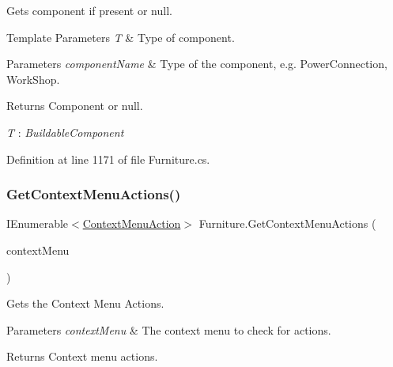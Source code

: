 Gets component if present or null. 


\begin{DoxyTemplParams}{Template Parameters}
{\em T} & Type of component.\\
\hline
\end{DoxyTemplParams}

\begin{DoxyParams}{Parameters}
{\em component\+Name} & Type of the component, e.\+g. Power\+Connection, Work\+Shop.\\
\hline
\end{DoxyParams}
\begin{DoxyReturn}{Returns}
Component or null.
\end{DoxyReturn}
\begin{Desc}
\item[Type Constraints]\begin{description}
\item[{\em T} : {\em Buildable\+Component}]\end{description}
\end{Desc}


Definition at line 1171 of file Furniture.\+cs.

\mbox{\label{class_furniture_ac89ee5662bc36695cc7d5b8eaa246f43}} 
\subsubsection{\texorpdfstring{Get\+Context\+Menu\+Actions()}{GetContextMenuActions()}}
{\footnotesize\ttfamily I\+Enumerable$<$\hyperlink{class_context_menu_action}{Context\+Menu\+Action}$>$ Furniture.\+Get\+Context\+Menu\+Actions (\begin{DoxyParamCaption}\item[{\hyperlink{class_context_menu}{Context\+Menu}}]{context\+Menu }\end{DoxyParamCaption})}



Gets the Context Menu Actions. 


\begin{DoxyParams}{Parameters}
{\em context\+Menu} & The context menu to check for actions.\\
\hline
\end{DoxyParams}
\begin{DoxyReturn}{Returns}
Context menu actions.
\end{DoxyReturn}



